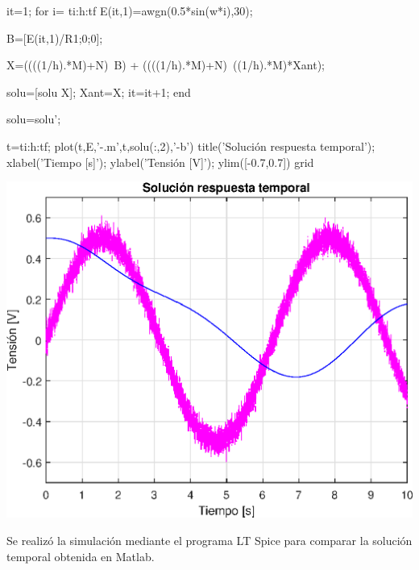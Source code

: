 \documentclass[10pt,a4paper]{article} %
\begin{document}
	
	\begin{matlabcode}
		it=1;
		for i= ti:h:tf
		E(it,1)=awgn(0.5*sin(w*i),30);
		
		B=[E(it,1)/R1;0;0];
		
		X=((((1/h).*M)+N)\ B) + ((((1/h).*M)+N)\ ((1/h).*M)*Xant);
		
		solu=[solu X];
		Xant=X;
		it=it+1;
		end
		\end{matlabcode}
		
		\vspace{1em}
		
		\begin{matlabcode}
		solu=solu';
		\end{matlabcode}
		
		
		\begin{matlabcode}
		t=ti:h:tf;
		plot(t,E,'-.m',t,solu(:,2),'-b')
		title('Solución respuesta temporal');
		xlabel('Tiempo [s]');
		ylabel('Tensión [V]');
		ylim([-0.7,0.7])
		grid
		\end{matlabcode}
		\begin{center}
		\includegraphics[width=\maxwidth{56.196688409433015em}]{figure_0_06}
		\end{center}
		
	Se realizó la simulación mediante el programa LT Spice para comparar la solución temporal obtenida en Matlab. 
\end{document}
